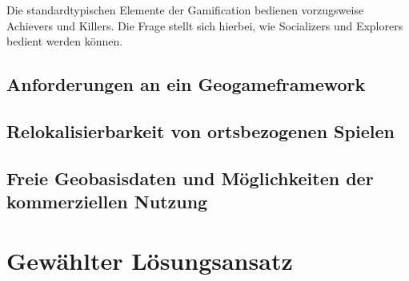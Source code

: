 Die standardtypischen Elemente der Gamification bedienen vorzugsweise Achievers und Killers.
Die Frage stellt sich hierbei, wie Socializers und Explorers bedient werden können.


%
\subsection*{Anforderungen an ein Geogameframework}

\subsection*{Relokalisierbarkeit von ortsbezogenen Spielen}

\subsection*{Freie Geobasisdaten und Möglichkeiten der kommerziellen Nutzung}

\section{Gewählter Lösungsansatz}


